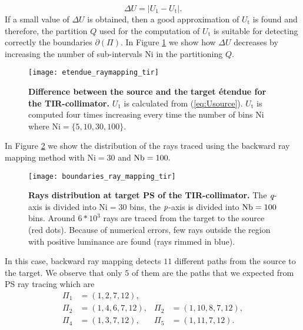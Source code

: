 \begin{equation}\label{eq:delta_raymapping}
\Delta U =  \big|U_1-U_{\textrm{t}}\big|.
\end{equation}
If a small value of $\Delta U$ is obtained, then a good approximation of $U_{\textrm{t}}$ is found and therefore, the partition $Q$ used for the computation of $U_{\textrm{t}}$ is suitable for detecting correctly the boundaries $\partial$$(\Pi)$. In Figure \ref{fig:etendue_raymapping_tir} we show how $\Delta U$ decreases by increasing the number of sub-intervals $\textrm{Ni}$ in the partitioning $Q$.  
\begin{figure}[h]
  \begin{center}
  \texttt{[image: etendue\_raymapping\_tir]}
  \end{center}
  \caption{\textbf{Difference between the source and the target \'{e}tendue for the TIR-collimator.}
 $U_1$ is calculated from (\ref{eq:Usource}). $U_{\textrm{t}}$ is computed four times increasing every time the number of bins $\textrm{Ni}$ where $\textrm{Ni}=\{5,10,30,100\}$. }
\label{fig:etendue_raymapping_tir}
 \end{figure}
In Figure \ref{fig:boundaries_TIR_ray_mapping} we show the distribution of the rays traced using the backward ray mapping method with $\textrm{Ni}=30$ and $\textrm{Nb} = 100.$ 
\begin{figure}[h]
  \begin{center}
  \texttt{[image: boundaries\_ray\_mapping\_tir]}
  \end{center}
  \caption{\textbf{Rays distribution at target PS of the TIR-collimator.}
 The $\textit{q}$-axis is divided into $\textrm{Ni}=30$ bins, the $\textit{p}$-axis is divided into $\textrm{Nb} = 100$ bins. Around $6*10^3$ rays are traced from the target to the source (red dots). Because of numerical errors, few rays outside the region with positive luminance are found (rays rimmed in blue).}
\label{fig:boundaries_TIR_ray_mapping}
 \end{figure}
In this case, backward ray mapping detects $11$ different paths from the source to the target. 
We observe that only $5$ of them are the paths that we expected from PS ray tracing which are
\begin{equation}\label{eq:paths_tir}
\begin{array}{llll}
\Pi_1&=(1,2,7,12), \\
\Pi_2&=(1,4,6,7,12), & \Pi_2&=(1,10,8,7,12),\\
\Pi_4&=(1,3,7,12), & \Pi_5&=(1,11,7,12).
\end{array}\end{equation}
